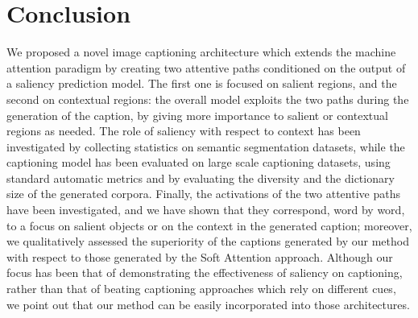 \section{Conclusion}
We proposed a novel image captioning architecture which extends the machine attention paradigm by creating two attentive paths conditioned on the output of a saliency prediction model. The first one is focused on salient regions, and the second on contextual regions: the overall model exploits the two paths during the generation of the caption, by giving more importance to salient or contextual regions as needed. The role of saliency with respect to context has been investigated by collecting statistics on semantic segmentation datasets, while the captioning model has been evaluated on large scale captioning datasets, using standard automatic metrics and by evaluating the diversity and the dictionary size of the generated corpora. Finally, the activations of the two attentive paths have been investigated, and we have shown that they correspond, word by word, to a focus on salient objects or on the context in the generated caption; moreover, we qualitatively assessed the superiority of the captions generated by our method with respect to those generated by the Soft Attention approach. Although our focus has been that of demonstrating the effectiveness of saliency on captioning, rather than that of beating captioning approaches which rely on different cues, we point out that our method can be easily incorporated into those architectures.



